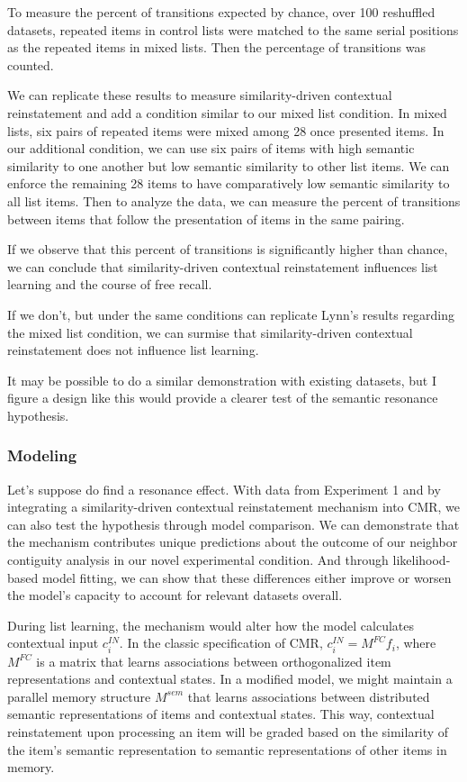 \documentclass[
  english,
  11pt,
  letterpaper,
]{article}
\begin{document}
To measure the percent of transitions expected by chance, over 100
reshuffled datasets, repeated items in control lists were matched to the
same serial positions as the repeated items in mixed lists. Then the
percentage of transitions was counted.

We can replicate these results to measure similarity-driven contextual
reinstatement and add a condition similar to our mixed list condition.
In mixed lists, six pairs of repeated items were mixed among 28 once
presented items. In our additional condition, we can use six pairs of
items with high semantic similarity to one another but low semantic
similarity to other list items. We can enforce the remaining 28 items to
have comparatively low semantic similarity to all list items. Then to
analyze the data, we can measure the percent of transitions between
items that follow the presentation of items in the same pairing.

If we observe that this percent of transitions is significantly higher
than chance, we can conclude that similarity-driven contextual
reinstatement influences list learning and the course of free recall.

If we don't, but under the same conditions can replicate Lynn's results
regarding the mixed list condition, we can surmise that
similarity-driven contextual reinstatement does not influence list
learning.

It may be possible to do a similar demonstration with existing datasets,
but I figure a design like this would provide a clearer test of the
semantic resonance hypothesis.

\subsubsection{Modeling}\label{modeling}

Let's suppose do find a resonance effect. With data from Experiment 1
and by integrating a similarity-driven contextual reinstatement
mechanism into CMR, we can also test the hypothesis through model
comparison. We can demonstrate that the mechanism contributes unique
predictions about the outcome of our neighbor contiguity analysis in our
novel experimental condition. And through likelihood-based model
fitting, we can show that these differences either improve or worsen the
model's capacity to account for relevant datasets overall.

During list learning, the mechanism would alter how the model calculates
contextual input \(c^{IN}_i\). In the classic specification of CMR,
\(c^{IN}_i = M^{FC}f_i\), where \(M^{FC}\) is a matrix that learns
associations between orthogonalized item representations and contextual
states. In a modified model, we might maintain a parallel memory
structure \(M^{sem}\) that learns associations between distributed
semantic representations of items and contextual states. This way,
contextual reinstatement upon processing an item will be graded based on
the similarity of the item's semantic representation to semantic
representations of other items in memory.
\end{document}
